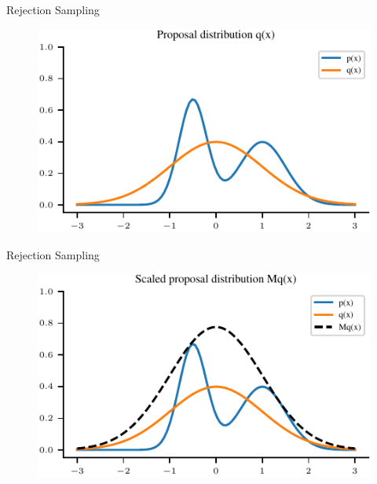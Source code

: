 \documentclass[handout]{beamer}
\begin{document}
    \begin{frame}{Rejection Sampling}
        \begin{figure}
            \centering
            \includegraphics{../figures/sampling/rejection-sampling--1.0-True-False-False-False-False-False-False-False.pdf}
        \end{figure}
    \end{frame}

    \begin{frame}{Rejection Sampling}
        \begin{figure}
            \centering
            \includegraphics{../figures/sampling/rejection-sampling--1.0-True-True-False-False-False-False-False-False.pdf}
        \end{figure}
    \end{frame}
\end{document}
